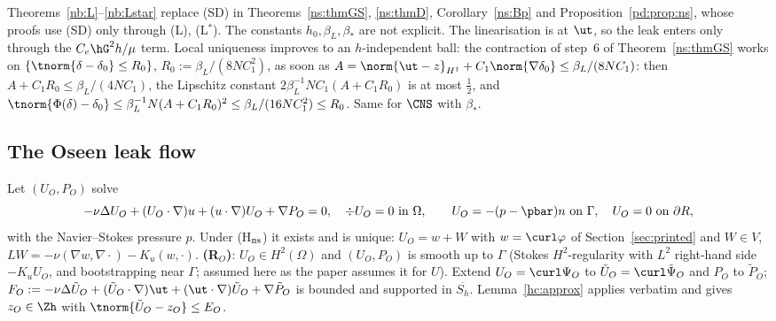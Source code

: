 \begin{remark}
Theorems~\ref{nb:L}--\ref{nb:Lstar} replace (SD) in Theorems~\ref{ns:thmGS}, \ref{ns:thmD}, Corollary~\ref{ns:Bp} and Proposition~\ref{pd:prop:ns}, whose proofs use (SD) only through (L), (L$^\ast$).
The constants $h_0,\beta_L,\beta_\ast$ are not explicit. The linearisation is at $\ut$, so the leak enters only through the $C_e\hG^2h/\mu$ term.
Local uniqueness improves to an $h$-independent ball: the contraction of step~6 of Theorem~\ref{ns:thmGS} works on $\{\tnorm{\delta-\delta_0}\le R_0\}$, $R_0:=\beta_L/(8NC_1^2)$, as soon as
$A=\norm{\ut-z}_{H^1}+C_1\norm{\nabla\delta_0}\le\beta_L/(8NC_1)$: then $A+C_1R_0\le\beta_L/(4NC_1)$, the Lipschitz constant $2\beta_L^{-1}NC_1(A+C_1R_0)$ is at most $\frac12$, and
$\tnorm{\Phi(\delta)-\delta_0}\le\beta_L^{-1}N(A+C_1R_0)^2\le\beta_L/(16NC_1^2)\le R_0$. Same for $\CNS$ with $\beta_\ast$.
\end{remark}

\subsection{The Oseen leak flow}\label{nb:oseen}

Let $(U_O,P_O)$ solve
\[
-\nu\Delta U_O+(U_O\cdot\nabla)u+(u\cdot\nabla)U_O+\nabla P_O=0,\quad \div U_O=0\ \text{in }\Omega,\qquad U_O=-(p-\pbar)n\ \text{on }\Gamma,\quad U_O=0\ \text{on }\partial R,
\]
with the Navier--Stokes pressure $p$. Under (H$_{\rm ns}$) it exists and is unique: $U_O=w+W$ with $w=\curl\varphi$ of Section~\ref{sec:printed} and $W\in V$, $LW=-\nu(\nabla w,\nabla\cdot)-K_u(w,\cdot)$.
\textbf{(R$_O$)}: $U_O\in H^2(\Omega)$ and $(U_O,P_O)$ is smooth up to $\Gamma$ (Stokes $H^2$-regularity with $L^2$ right-hand side $-K_uU_O$, and bootstrapping near $\Gamma$; assumed here as the paper assumes it for $U$).
Extend $U_O=\curl\Psi_O$ to $\tilde U_O=\curl\tilde\Psi_O$ and $P_O$ to $\tilde P_O$; $F_O:=-\nu\Delta\tilde U_O+(\tilde U_O\cdot\nabla)\ut+(\ut\cdot\nabla)\tilde U_O+\nabla\tilde P_O$ is bounded and supported in $\overline{S_h}$.
Lemma~\ref{hc:approx} applies verbatim and gives $z_O\in\Zh$ with $\tnorm{\tilde U_O-z_O}\le E_O$.

